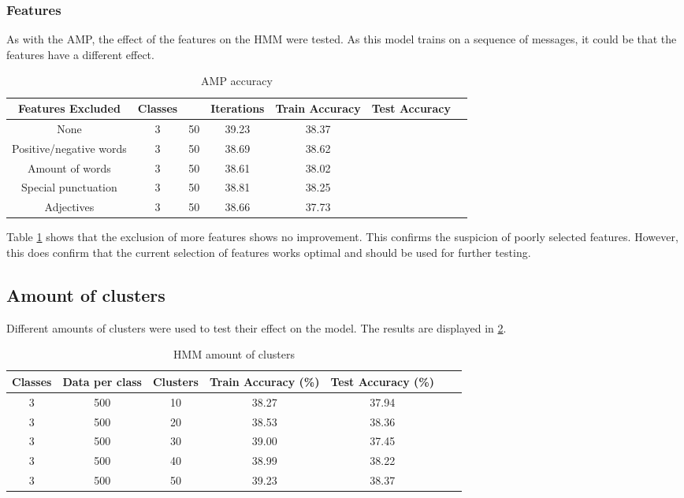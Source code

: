 \subsubsection*{Features}
As with the AMP, the effect of the features on the HMM were tested. As this model trains on a sequence of messages, it could be that the features have a different effect.

\begin{table}[h!]
\begin{center}
\begin{tabular}{| c | c | c | c | c | c | c |}
\hline
 {\textbf{Features Excluded}} 	 	& \textbf{Classes}	&		& {\textbf{Iterations}} 
 & {\textbf{Train Accuracy}} 					& {\textbf{Test Accuracy}} 
 \\
\hline
None						&	3	&	50	&	39.23	&	38.37	\\
Positive/negative words	&	3	&	50	&	38.69	&	38.62	\\
Amount of words			&	3	&	50	&	38.61	&	38.02	\\
Special punctuation		&	3	&	50	&	38.81	&	38.25	\\
Adjectives				&	3	&	50	&	38.66	&	37.73	\\
\hline
\end{tabular}
\caption{AMP accuracy}
\label{table:HMMfeatures}
\end{center}
\end{table}

Table \ref{table:HMMfeatures} shows that the exclusion of more features shows no improvement. This confirms the suspicion of poorly selected features. However, this does confirm that the current selection of features works optimal and should be used for further testing.

\subsection*{Amount of clusters}
Different amounts of clusters were used to test their effect on the model. The results are displayed in \ref{table:HMMclusters}.
\begin{table}[h!]
\begin{center}
\begin{tabular}{| c | c | c | c | c | c | c |}
\hline
 {\textbf{Classes}} 	 
 & {\textbf{Data per class}} 					& {\textbf{Clusters}} 
 & {\textbf{Train Accuracy (\%)}} 					& {\textbf{Test Accuracy (\%)}} 
 \\
\hline
3 	 		& 500 		& 10			& 38.27		& 37.94		\\
3 	 		& 500 		& 20			& 38.53		& 38.36		\\
3 	 		& 500 		& 30			& 39.00		& 37.45		\\
3 	 		& 500 		& 40			& 38.99		& 38.22		\\
3 	 		& 500 		& 50			& 39.23		& 38.37		\\
\hline
\end{tabular}
\caption{HMM amount of clusters}
\label{table:HMMclusters}
\end{center}
\end{table}

